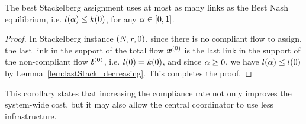 \begin{corollary}
\label{corollary:StackVSNash}
The best Stackelberg assignment uses at most as many links as the Best Nash equilibrium, i.e. ${ l(\alpha) \leq k(0) }$, for any $\alpha \in [0,1]$.
\end{corollary}
\begin{proof}
In Stackelberg instance $(N, r, 0)$, since there is no compliant flow to assign, the last link in the support of the total flow $\boldsymbol {x}^{(0)}$ is the last link in the support of the non-compliant flow $\boldsymbol {t}^{(0)}$, i.e. $l(0) = k(0)$, and since $\alpha \geq 0$, we have $l(\alpha) \leq l(0)$ by Lemma~\ref{lem:lastStack_decreasing}. This completes the proof.
\end{proof}

This corollary states that increasing the compliance rate not only improves the system-wide cost, but it may also allow the central coordinator to use less infrastructure.

